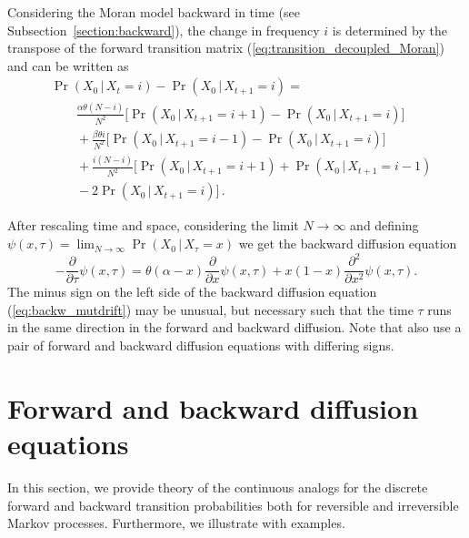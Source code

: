 \documentclass[preprint]{elsarticle}
\newcommand\given{{\,|\,}}
\newcommand\x[1]{\ensuremath{X_{#1}}}
\begin{document}
Considering the Moran model backward in time (see Subsection~\ref{section:backward}), the change in frequency $i$ is determined by the transpose of the forward transition matrix (\ref{eq:transition_decoupled_Moran}) and can be written as
\begin{equation}\label{eq:back_discr_mutation}
\begin{split}
&\Pr(\x{0} \given\x{t}=i)-\Pr(\x{0}\given\x{t+1}=i) = \\
&\qquad \frac{\alpha \theta (N-i)}{N^2} \bigg[\Pr(\x{0}\given\x{t+1}=i+1)-\Pr(\x{0}\given\x{t+1}=i)\bigg]\\
&\qquad+ \frac{\beta \theta i}{N^2} \bigg[\Pr(\x{0}\given\x{t+1}=i-1)-\Pr(\x{0}\given\x{t+1}=i)\bigg]\\
&\qquad+ \frac{i(N-i)}{N^2} \bigg[\Pr(\x{0}\given\x{t+1}=i+1)+\Pr(\x{0}\given\x{t+1}=i-1)\\
&\qquad-2\Pr(\x{0}\given\x{t+1}=i)\bigg]\,.
\end{split}
\end{equation}

After rescaling time and space, considering the limit $N \to \infty$ and defining $\psi(x,\tau)=\lim_{N\to\infty}\Pr(\x{0}\given\x{\tau}=x)$ we get the backward diffusion equation
\begin{equation}\label{eq:backw_mutdrift}
-\frac{\partial}{\partial \tau} \psi(x,\tau) =
    \theta(\alpha-x)\frac{\partial}{\partial x} \psi(x,\tau) +x(1-x)\frac{\partial^2}{\partial x^2}\psi(x,\tau).
\end{equation}
The minus sign on the left side of the backward diffusion equation (\ref{eq:backw_mutdrift}) may be unusual, but necessary such that the time $\tau$ runs in the same direction in the forward and backward diffusion. Note that \citet{Zhao13a} also use a pair of forward and backward diffusion equations with differing signs.


\section{Forward and backward diffusion equations}\label{forwBackDiff}

In this section, we provide theory of the continuous analogs for the discrete forward and backward transition probabilities both for reversible and irreversible Markov processes. Furthermore, we illustrate with examples.
\end{document}
